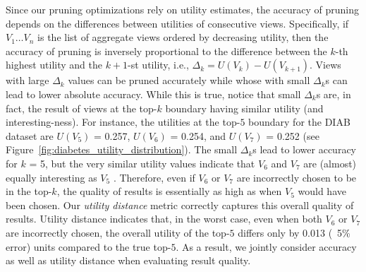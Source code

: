 Since our pruning optimizations rely on utility estimates, the accuracy of pruning
depends on the differences between utilities of consecutive views.
Specifically, if $V_1 \ldots V_n$ is the list of aggregate views ordered by decreasing 
utility, then the accuracy of pruning is inversely proportional to 
the difference between the $k$-th highest utility and the $k+1$-st utility, 
i.e., $\Delta_k = U(V_k) - U(V_{k+1})$.
Views with large $\Delta_k$ values can be pruned accurately while whose with
small $\Delta_k$s can lead to lower absolute accuracy.
While this is true, notice that small $\Delta_k$s are, in fact, the result of views at 
the top-$k$ boundary having similar utility (and interesting-ness).
For instance, the utilities at the top-$5$ boundary for the DIAB dataset are 
$U(V_5)$ = 0.257, $U(V_6)$ = 0.254, and $U(V_7)$ = 0.252 (see Figure~\ref{fig:diabetes_utility_distribution}).
The small $\Delta_k$s lead to lower accuracy for $k$ = 5, but the 
very similar utility values indicate that $V_6$ and $V_7$ are (almost) equally interesting as $V_5$ .
Therefore, even if $V_6$ or $V_7$ are incorrectly chosen to be in the top-$k$, 
the quality of results is essentially as high as when $V_5$ would have been chosen.
Our {\em utility distance} metric correctly captures this overall quality of results.
Utility distance indicates that, in the worst case, even when both $V_6$ or $V_7$ are 
incorrectly chosen, the overall utility of the top-$5$ differs only by 0.013 (~5\% error) 
units compared to the true top-$5$.
As a result, we jointly consider accuracy as well as utility distance when evaluating 
result quality.



